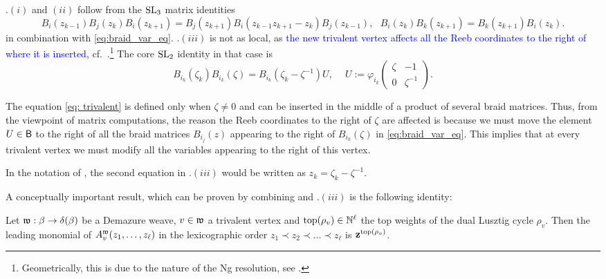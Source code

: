 \noindent {}.$(i)$ and $(ii)$ follow from the $\SL_3$ matrix identities
\begin{equation}
\label{eq: braid moves}
B_i(z_{k-1})B_j(z_k)B_i(z_{k+1}) = B_j(z_{k+1})B_i(z_{k-1}z_{k+1} - z_k)B_j(z_{k-1}),\mbox{ }B_i(z_{k})B_k(z_{k+1}) = B_k(z_{k+1})B_i(z_k).
\end{equation}
in combination with \eqref{eq:braid_var_eq}.
\noindent {}.$(iii)$ is not as local, as \textcolor{blue}{the new trivalent vertex affects all the Reeb coordinates to the right of where it is inserted}, cf.~\cite[Section 5.1]{CGGLSS25}.\footnote{Geometrically, this is due to the nature of the Ng resolution, see \cite[Section 2.1]{Ng03_computable}.} The core $\SL_2$ identity in that case is
\begin{equation}
\label{eq: trivalent}
B_{i_k}(\zeta_k)B_{i_k}(\zeta) = B_{i_k}(\zeta_k - \zeta^{-1})U,\ \quad  U := \varphi_{i_k}\left(\begin{matrix} \zeta & -1 \\ 0 & \zeta^{-1} \end{matrix} \right).
\end{equation}
 

\noindent The equation \eqref{eq: trivalent} is defined only when $\zeta \neq 0$ and can be inserted in the middle of a product of several braid matrices. Thus, from the viewpoint of matrix computations, the reason the Reeb coordinates to the right of $\zeta$ are affected is because we must move the element $U \in \borel$ to the right of all the braid matrices $B_{i_j}(z)$ appearing to the right of $B_{i_k}(\zeta)$ in \eqref{eq:braid_var_eq}. This implies that at every trivalent vertex we must modify all the variables appearing to the right of this vertex.\\

\begin{remark}
In the notation of \cite{CGGJ24,CGGLSS25}, the second equation in .$(iii)$ would be written as $z_k=\zeta_k-\zeta^{-1}$.\sbs
\end{remark}

\noindent A conceptually important result, which can be proven by combining  and .$(iii)$ is the following identity:

\begin{theorem}[in progress]\label{thm:leading_monomial_cluster_A_variables}
Let $\w:\beta\to\delta(\beta)$ be a Demazure weave, $v\in\w$ a trivalent vertex and $\top(\rho_v)\in\N^\ell$ the top weights of the dual Lusztig cycle $\rho_v$. Then the leading monomial of $A^\w_v(z_1,\ldots,z_\ell)$ in the lexicographic order $z_1\prec z_2\prec \ldots\prec z_\ell$ is ${\bf z}^{\top(\rho_v)}$.\sbs
\end{theorem}


